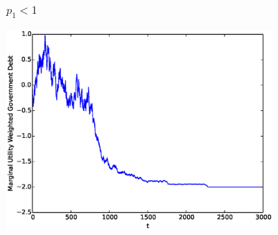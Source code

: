 \documentclass{beamer}
\begin{document}
\begin{frame}
	\frametitle{$p_1 < 1$}
	\begin{center}
	\includegraphics[width=4in]{Images/port2.eps}
	\end{center}
\end{frame}
% 
% 
% 
\end{document}
